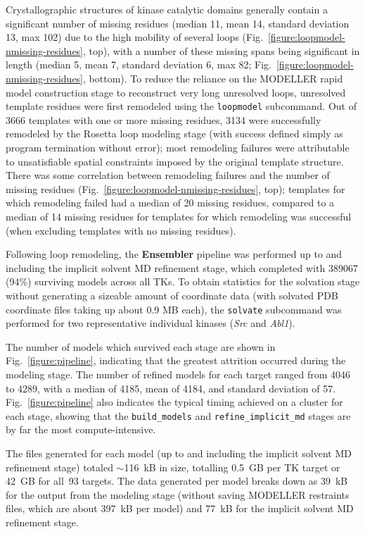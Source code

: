 \documentclass[aps,pre,twocolumn,nofootinbib,superscriptaddress,linenumbers]{revtex4-1}
\begin{document}
Crystallographic structures of kinase catalytic domains generally contain a significant number of missing residues (median 11, mean 14, standard deviation 13, max 102) due to the high mobility of several loops (Fig.~\ref{figure:loopmodel-nmissing-residues}, top), with a number of these missing spans being significant in length (median 5, mean 7, standard deviation 6, max 82; Fig.~\ref{figure:loopmodel-nmissing-residues}, bottom).
To reduce the reliance on the MODELLER rapid model construction stage to reconstruct very long unresolved loops, unresolved template residues were first remodeled using the {\tt loopmodel} subcommand.
Out of \num{3666} templates with one or more missing residues, \num{3134} were successfully remodeled by the Rosetta loop modeling stage (with success defined simply as program termination without error); most remodeling failures were attributable to unsatisfiable spatial constraints imposed by the original template structure.
\color{red}
There was some correlation between remodeling failures and the number of missing residues (Fig.~\ref{figure:loopmodel-nmissing-residues}, top); templates for which remodeling failed had a median of 20 missing residues, compared to a median of 14 missing residues for templates for which remodeling was successful (when excluding templates with no missing residues).
\color{black}

Following loop remodeling, the {\bf Ensembler} pipeline was performed up to and including the implicit solvent MD refinement stage, which completed with \num{389067} (94\%) surviving models across all TKs.
To obtain statistics for the solvation stage without generating a sizeable amount of coordinate data (with solvated PDB coordinate files taking up about 0.9 MB each), the {\tt solvate} subcommand was performed for two representative individual kinases (\emph{Src} and \emph{Abl1}).

The number of models which survived each stage are shown in Fig.~\ref{figure:pipeline}, indicating that the greatest attrition occurred during the modeling stage.
The number of refined models for each target ranged from \num{4046} to \num{4289}, with a median of \num{4185}, mean of \num{4184}, and standard deviation of \num{57}.
Fig.~\ref{figure:pipeline} also indicates the typical timing achieved on a cluster for each stage, showing that the {\tt build\_models} and {\tt refine\_implicit\_md} stages are by far the most compute-intensive.

The files generated for each model (up to and including the implicit solvent MD refinement stage) totaled $\sim$116~kB in size, totalling 0.5~GB per TK target or 42~GB for all~93 targets.
The data generated per model breaks down as 39~kB for the output from the modeling stage (without saving MODELLER restraints files, which are about 397~kB per model) and 77~kB for the implicit solvent MD refinement stage.
\end{document}
